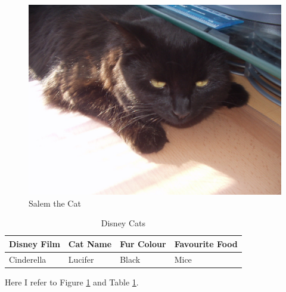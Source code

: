 \documentclass[10pt,a4paper]{article}
\begin{document}
\begin{figure}[ht]
	\centering
	\includegraphics[width = .95\linewidth]{images/Salem.JPG}
	\caption{Salem the Cat}	
	\label{fig:figure1}
\end{figure}

\begin{table}[ht]
\begin{center}
\begin{tabular}{ p{90pt} | p{90pt} | p{90pt} | p{90pt}} 
Disney Film 				& Cat Name 	& Fur Colour 		& Favourite Food	\\ \hline
Cinderella 				& Lucifer 		& Black 			& Mice 			\\ \hline
\end{tabular}
\caption{Disney Cats}
\label{tab:table1}
\end{center}
\end{table}

Here I refer to Figure \ref{fig:figure1} and Table \ref{tab:table1}.
\end{document}
